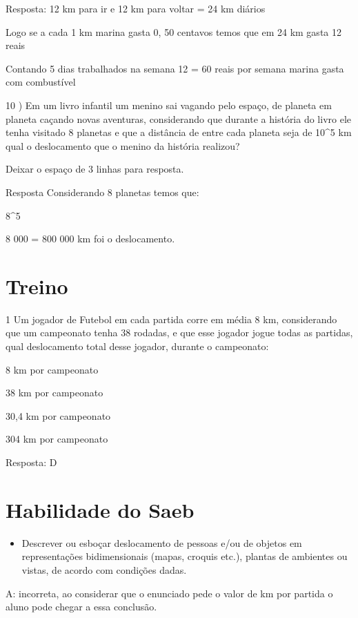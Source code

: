 Resposta: 12 km para ir e 12 km para voltar = 24 km diários

Logo se a cada 1 km marina gasta 0, 50 centavos temos que em 24 km gasta
12 reais

Contando 5 dias trabalhados na semana 12 = 60 reais por semana
marina gasta com combustível

10 ) Em um livro infantil um menino sai vagando pelo espaço, de planeta
em planeta caçando novas aventuras, considerando que durante a história
do livro ele tenha visitado 8 planetas e que a distância de entre cada
planeta seja de 10^5 km qual o deslocamento que o
menino da história realizou?

Deixar o espaço de 3 linhas para resposta.

Resposta Considerando 8 planetas temos que:

8^5

8 000 = 800 000 km foi o deslocamento.

\section{Treino}

\num{1} Um jogador de Futebol em cada partida corre em média 8 km,
considerando que um campeonato tenha 38 rodadas, e que esse jogador
jogue todas as partidas, qual deslocamento total desse jogador, durante
o campeonato:

\item 8 km por campeonato
\item 38 km por campeonato
\item 30,4 km por campeonato
\item 304 km por campeonato

Resposta: D

\section{Habilidade do Saeb}

\begin{itemize}
\tightlist

\item 
  Descrever ou esboçar deslocamento de pessoas e/ou de objetos em
  representações bidimensionais (mapas, croquis etc.), plantas de
  ambientes ou vistas, de acordo com condições dadas.
\end{itemize}

A: incorreta, ao considerar que o enunciado pede o valor de km por
partida o aluno pode chegar a essa conclusão.

